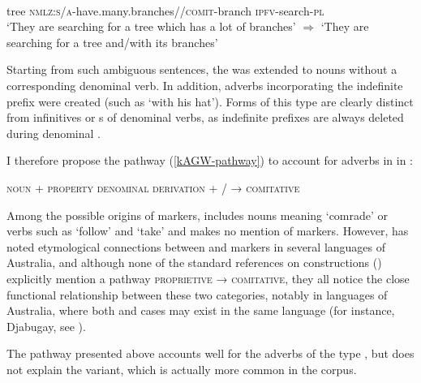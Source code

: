 \documentclass[output=paper]{langsci/langscibook}
\begin{document}
  \begin{exe}
\ex \label{ex:kAGWrtWrtaR2}
\gll   
   	  \\
  tree \textsc{nmlz}:\textsc{s\slash a}-have.many.branches//\textsc{comit}-branch \textsc{ipfv}-search-\textsc{pl} \\
\glt `They are searching for a tree which has a lot of branches' $\Rightarrow$ `They are searching for a tree and/with its branches'
\end{exe}

Starting from such ambiguous sentences, the  was extended to nouns without a corresponding  denominal verb. In addition,  adverbs incorporating the indefinite  prefix were created (such as  `with his hat'). Forms of this type are clearly distinct from infinitives or s of denominal verbs, as indefinite  prefixes are always deleted during  denominal .


I therefore propose the pathway (\ref{kAGW-pathway}) to account for  adverbs in  in :

 \begin{exe}
\ex \label{kAGW-pathway}
 \glt  \textsc{noun} + \textsc{property denominal derivation} + / → \textsc{comitative}
\end{exe} 

Among the possible origins of  markers,  \citet[91, 139, 287]{heine-kuteva02} includes nouns meaning `comrade' or verbs such as `follow' and `take' and makes no mention of  markers. However, \citet{sutton76having} has noted etymological connections between  and  markers in several languages of Australia, and although none of the standard references on  constructions (\citealt{stassen00and, stolz06comitative, arkhipov09comitative}) explicitly mention a pathway \textsc{proprietive} → \textsc{comitative}, they all notice the close functional relationship between these two categories, notably in languages of Australia, where both  and  cases may exist in the same language (for instance, Djabugay, see \citealt{patz91djabugay}).
 

The pathway presented above accounts well for the  adverbs of the type , but does not explain the  variant, which is actually more common in the corpus.
\end{document}
